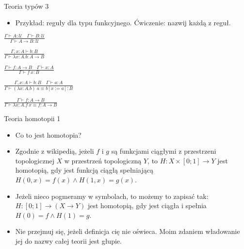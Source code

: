 \documentclass{beamer}
\newcommand{\U}{\mathcal{U}}
\begin{document}
\begin{frame}{Teoria typów 3}

\begin{itemize}
	\item Przykład: reguły dla typu funkcyjnego. Ćwiczenie: nazwij każdą z reguł.
\end{itemize}

	\begin{center}
		$\displaystyle \frac{\Gamma \vdash A : \U \quad \Gamma \vdash B : \U}{\Gamma \vdash A \to B : \U}$
	\end{center}
	\begin{center}
		$\displaystyle \frac{\Gamma, x : A \vdash b : B}{\Gamma \vdash \lambda x:A.b : A \to B}$
	\end{center}
	\begin{center}
		$\displaystyle \frac{\Gamma \vdash f : A \to B \quad \Gamma \vdash x : A}{\Gamma \vdash f\ x : B}$
	\end{center}
	\begin{center}
		$\displaystyle \frac{\Gamma, x : A \vdash b : B \quad \Gamma \vdash a : A}{\Gamma \vdash (\lambda x:A.b)\ a \equiv b[x := a] : B}$
	\end{center}
	\begin{center}
		$\displaystyle \frac{\Gamma \vdash f : A \to B}{\Gamma \vdash \lambda x:A.f\ x \equiv f : A \to B}$
	\end{center}
\end{frame}

\begin{frame}{Teoria homotopii 1}
\begin{itemize}
	\item Co to jest homotopia?
	\item Zgodnie z wikipedią, jeżeli $f$ i $g$ są funkcjami ciągłymi z przestrzeni topologicznej $X$ w przestrzeń topologiczną $Y$, to $H: X \times [0; 1] \to Y$ jest homotopią, gdy jest funkcją ciągłą spełniającą $H(0, x) = f(x) \land H(1, x) = g(x)$.
	\item Jeżeli nieco pogmeramy w symbolach, to możemy to zapisać tak: $H: [0; 1] \to (X \to Y)$ jest homotopią, gdy jest ciągła i spełnia $H(0) = f \land H(1) = g$.
	\item Nie przejmuj się, jeżeli definicja cię nie oświeca. Moim zdaniem władowanie jej do nazwy całej teorii jest głupie.
\end{itemize}
\end{frame}
\end{document}
